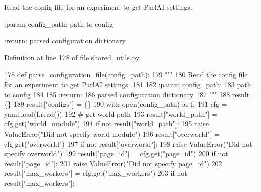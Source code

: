\begin{DoxyVerb}Read the config file for an experiment to get ParlAI settings.

:param config_path:
    path to config

:return:
    parsed configuration dictionary
\end{DoxyVerb}
 

Definition at line 178 of file shared\+\_\+utils.\+py.


\begin{DoxyCode}
178 \textcolor{keyword}{def }\hyperlink{namespaceparlai_1_1chat__service_1_1services_1_1messenger_1_1shared__utils_a81d665344fc48303d4cc4cf8fe48066e}{parse\_configuration\_file}(config\_path):
179     \textcolor{stringliteral}{"""}
180 \textcolor{stringliteral}{    Read the config file for an experiment to get ParlAI settings.}
181 \textcolor{stringliteral}{}
182 \textcolor{stringliteral}{    :param config\_path:}
183 \textcolor{stringliteral}{        path to config}
184 \textcolor{stringliteral}{}
185 \textcolor{stringliteral}{    :return:}
186 \textcolor{stringliteral}{        parsed configuration dictionary}
187 \textcolor{stringliteral}{    """}
188     result = \{\}
189     result[\textcolor{stringliteral}{"configs"}] = \{\}
190     with open(config\_path) \textcolor{keyword}{as} f:
191         cfg = yaml.load(f.read())
192         \textcolor{comment}{# get world path}
193         result[\textcolor{stringliteral}{"world\_path"}] = cfg.get(\textcolor{stringliteral}{"world\_module"})
194         \textcolor{keywordflow}{if} \textcolor{keywordflow}{not} result[\textcolor{stringliteral}{"world\_path"}]:
195             \textcolor{keywordflow}{raise} ValueError(\textcolor{stringliteral}{"Did not specify world module"})
196         result[\textcolor{stringliteral}{"overworld"}] = cfg.get(\textcolor{stringliteral}{"overworld"})
197         \textcolor{keywordflow}{if} \textcolor{keywordflow}{not} result[\textcolor{stringliteral}{"overworld"}]:
198             \textcolor{keywordflow}{raise} ValueError(\textcolor{stringliteral}{"Did not specify overworld"})
199         result[\textcolor{stringliteral}{"page\_id"}] = cfg.get(\textcolor{stringliteral}{"page\_id"})
200         \textcolor{keywordflow}{if} \textcolor{keywordflow}{not} result[\textcolor{stringliteral}{"page\_id"}]:
201             \textcolor{keywordflow}{raise} ValueError(\textcolor{stringliteral}{"Did not specify page\_id"})
202         result[\textcolor{stringliteral}{"max\_workers"}] = cfg.get(\textcolor{stringliteral}{"max\_workers"})
203         \textcolor{keywordflow}{if} \textcolor{keywordflow}{not} result[\textcolor{stringliteral}{"max\_workers"}]:

\end{DoxyCode}
